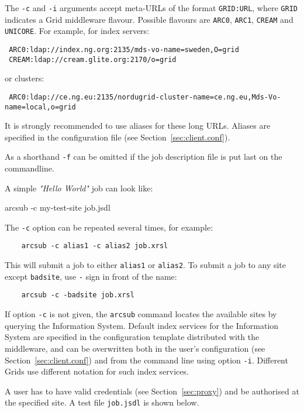 \begin{framed}
The \verb#-c# and \verb#-i# arguments accept meta-URLs of the format \texttt{GRID:URL}, where \texttt{GRID} indicates a Grid middleware flavour. Possible flavours are \texttt{ARC0}, \texttt{ARC1}, \texttt{CREAM} and \texttt{UNICORE}. For example, for index servers:
\begin{verbatim}
 ARC0:ldap://index.ng.org:2135/mds-vo-name=sweden,O=grid
 CREAM:ldap://cream.glite.org:2170/o=grid
\end{verbatim}
or clusters:

\verb# ARC0:ldap://ce.ng.eu:2135/nordugrid-cluster-name=ce.ng.eu,Mds-Vo-name=local,o=grid#

It is strongly recommended to use aliases for these long URLs. Aliases are specified in the configuration file (see Section~\ref{sec:client.conf}).
\end{framed}

As a shorthand \texttt{-f} can be omitted if the job description file is put last on the commandline.

A simple \textit{"Hello World"} job can look like:

\begin{shaded}
 arcsub -c my-test-site job.jsdl
\end{shaded}

The \verb#-c# option can be repeated several times, for example:
\begin{verbatim}
    arcsub -c alias1 -c alias2 job.xrsl
\end{verbatim}
This will submit a job to either \verb#alias1# or \verb#alias2#. To submit a job to any site except
\verb#badsite#, use \verb#-# sign in front of the name:
\begin{verbatim}
    arcsub -c -badsite job.xrsl
\end{verbatim}

If option \verb#-c# is not given, the \verb#arcsub# command locates the available sites by querying the
Information System. Default index services for the Information System are specified in the
configuration template distributed with the middleware, and can be overwritten both in the user's
configuration (see Section~\ref{sec:client.conf}) and from the command line using option
\verb#-i#. Different Grids use different notation for such index services.

A user has to have valid credentials (see Section~\ref{sec:proxy}) and be authorised at the specified site. A test file \texttt{job.jsdl} is shown below.

